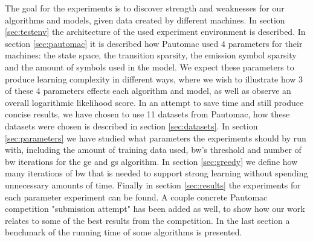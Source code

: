 The goal for the experiments is to discover strength and weaknesses for our algorithms and models, given data created by different machines. In section \ref{sec:testenv} the architecture of the used experiment environment is described. In section \ref{sec:pautomac} it is described how Pautomac used 4 parameters for their machines: the state space, the transition sparsity, the emission symbol sparsity and the amount of symbols used in the model. We expect these parameters to produce learning complexity in different ways, where we wish to illustrate how 3 of these 4 parameters effects each algorithm and model, as well as observe an overall logarithmic likelihood score. In an attempt to save time and still produce concise results, we have chosen to use 11 datasets from Pautomac, how these datasets were chosen is described in section \ref{sec:datasets}. In section \ref{sec:parameters} we have studied what parameters the experiments should by run with, including the amount of training data used, \gls{bw}'s threshold and number of \gls{bw} iterations for the \gls{ge} and \gls{gs} algorithm. In section \ref{sec:greedy} we define how many iterations of \gls{bw} that is needed to support strong learning without spending unnecessary amounts of time.
Finally in section \ref{sec:results} the experiments for each parameter experiment can be found. A couple concrete Pautomac competition "submission attempt" has been added as well, to show how our work relates to some of the best results from the competition. In the last section a benchmark of the running time of some algorithms is presented.
